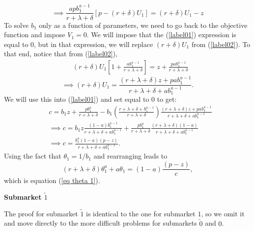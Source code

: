 \documentclass[12pt]{article} %
\theoremstyle{definition}
\begin{document}
\begin{appendix}
\begin{equation}
    \implies \frac{a p b_1^{a-1}}{r+\lambda+\delta} \left[p-(r+\delta)U_1\right] = (r+\delta)U_1-z \label{label02} %
\end{equation}
To solve $b_1$ only as a function of parameters, we need to go back to the objective function and impose $V_1=0$. We will impose that the 
(\ref{label01}) expression is equal to 0, but in that expression, we will replace $(r+\delta)U_1$ from (\ref{label02}). To that end, notice that from (\ref{label02}),
\begin{align*}
    & (r+\delta) U_1 \left[1 + \frac{ab_1^{a-1}}{r+\lambda+\delta}\right] = z + \frac{p a b_1^{a-1}}{r+\lambda+\delta}
\end{align*}
\begin{equation}
 \implies (r+\delta) U_1 = \frac{(r+\lambda+\delta)z + p a b_1^{a-1}}{r+\lambda+\delta+a b_1^{a-1}}.  \label{twostar} %
\end{equation}
We will use this into (\ref{label01}) and set equal to 0 to get: 
\begin{align*}
& c = b_1z + \frac{pb_1^a}{r+\lambda+\delta} - b_1 \left(\frac{r+\lambda+\delta+b_1^{a-1}}{r+\lambda+\delta}\right) \frac{(r+\lambda+\delta)z + p a b_1^{a-1}}{r+\lambda+\delta+a b_1^{a-1}} \\ 
& \implies c = b_1z \frac{(1-a)b_1^{a-1}}{r+\lambda+\delta+ab_1^{a-1}} +  \frac{pb_1^a}{r+\lambda+\delta} \frac{(r+\lambda+\delta)(1-a)}{r+\lambda+\delta+a b_1^{a-1}} \\
& \implies c = \frac{b_1^a (1-a)(p-z)}{r+\lambda+\delta+a b_1^{a-1}}. 
\end{align*}
Using the fact that $\theta_1=1/b_1$ and rearranging leads to  $$(r+\lambda+\delta)\theta_1^a + a \theta_1 = (1-a) \frac{(p-z)}{c},$$ which is equation (\ref{eq theta 1}). 

\medskip 

\noindent \textbf{Submarket $\tilde{1}$}

\medskip

\noindent The proof for submarket $\tilde{1}$ is identical to the one for submarket $1$, so we omit it and move directly to the more difficult problems for submarkets $\tilde{0}$ and $0$. 


\end{appendix}
\end{document}
